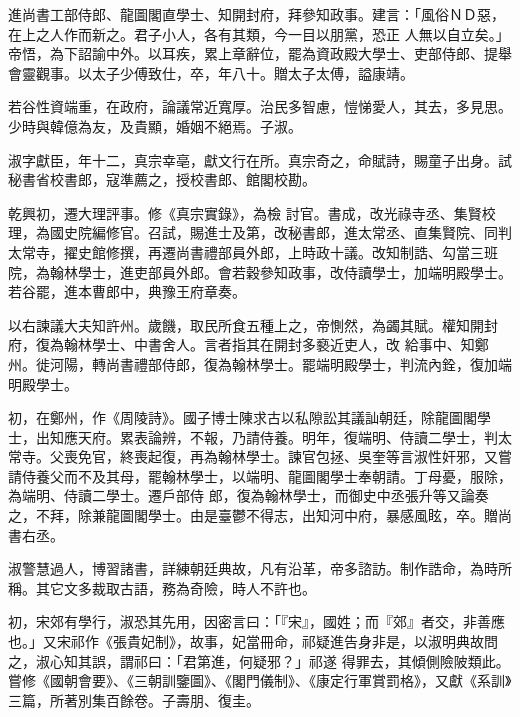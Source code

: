 \begin{pinyinscope}
 進尚書工部侍郎、龍圖閣直學士、知開封府，拜參知政事。建言：「風俗ＮＤ惡，在上之人作而新之。君子小人，各有其類，今一目以朋黨，恐正
 人無以自立矣。」帝悟，為下詔諭中外。以耳疾，累上章辭位，罷為資政殿大學士、吏部侍郎、提舉會靈觀事。以太子少傅致仕，卒，年八十。贈太子太傅，謚康靖。



 若谷性資端重，在政府，論議常近寬厚。治民多智慮，愷悌愛人，其去，多見思。少時與韓億為友，及貴顯，婚姻不絕焉。子淑。



 淑字獻臣，年十二，真宗幸亳，獻文行在所。真宗奇之，命賦詩，賜童子出身。試秘書省校書郎，寇準薦之，授校書郎、館閣校勘。



 乾興初，遷大理評事。修《真宗實錄》，為檢
 討官。書成，改光祿寺丞、集賢校理，為國史院編修官。召試，賜進士及第，改秘書郎，進太常丞、直集賢院、同判太常寺，擢史館修撰，再遷尚書禮部員外郎，上時政十議。改知制誥、勾當三班院，為翰林學士，進吏部員外郎。會若穀參知政事，改侍讀學士，加端明殿學士。若谷罷，進本曹郎中，典豫王府章奏。



 以右諫議大夫知許州。歲饑，取民所食五種上之，帝惻然，為蠲其賦。權知開封府，復為翰林學士、中書舍人。言者指其在開封多褻近吏人，改
 給事中、知鄭州。徙河陽，轉尚書禮部侍郎，復為翰林學士。罷端明殿學士，判流內銓，復加端明殿學士。



 初，在鄭州，作《周陵詩》。國子博士陳求古以私隙訟其議訕朝廷，除龍圖閣學士，出知應天府。累表論辨，不報，乃請侍養。明年，復端明、侍讀二學士，判太常寺。父喪免官，終喪起復，再為翰林學士。諫官包拯、吳奎等言淑性奸邪，又嘗請侍養父而不及其母，罷翰林學士，以端明、龍圖閣學士奉朝請。丁母憂，服除，為端明、侍讀二學士。遷戶部侍
 郎，復為翰林學士，而御史中丞張升等又論奏之，不拜，除兼龍圖閣學士。由是臺鬱不得志，出知河中府，暴感風眩，卒。贈尚書右丞。



 淑警慧過人，博習諸書，詳練朝廷典故，凡有沿革，帝多諮訪。制作誥命，為時所稱。其它文多裁取古語，務為奇險，時人不許也。



 初，宋郊有學行，淑恐其先用，因密言曰：「『宋』，國姓；而『郊』者交，非善應也。」又宋祁作《張貴妃制》，故事，妃當冊命，祁疑進告身非是，以淑明典故問之，淑心知其誤，謂祁曰：「君第進，何疑邪？」祁遂
 得罪去，其傾側險陂類此。嘗修《國朝會要》、《三朝訓鑒圖》、《閣門儀制》、《康定行軍賞罰格》，又獻《系訓》三篇，所著別集百餘卷。子壽朋、復圭。




\end{pinyinscope}
